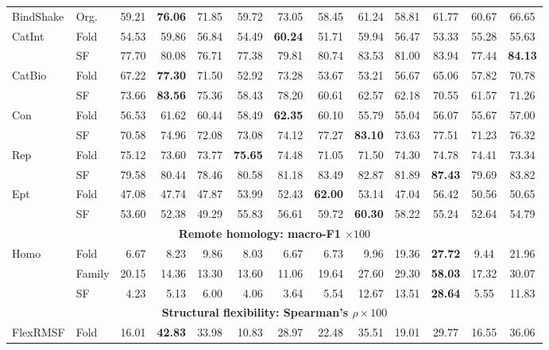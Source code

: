 \documentclass{article}
\begin{document}
\begin{minipage}{\linewidth}
\begin{tabular*}{\linewidth}{@{\extracolsep{\fill}}ll*{7}{r}@{\hspace{1.5pt}\vrule width 0.45pt\hspace{1.5pt}}*{4}{c}@{}}
BindShake & Org. & 59.21 & \textbf{76.06} & 71.85 & 59.72 & 73.05 & 58.45 & 61.24 & 58.81 & 61.77 & 60.67 & 66.65 \\
\multirow{2}{*}{CatInt} & Fold & 54.53 & 59.86 & 56.84 & 54.49 & \textbf{60.24} & 51.71 & 59.94 & 56.47 & 53.33 & 55.28 & 55.63 \\
 & SF   & 77.70 & 80.08 & 76.71 & 77.38 & 79.81 & 80.74 & 83.53 & 81.00 & 83.94 & 77.44 & \textbf{84.13} \\
\multirow{2}{*}{CatBio} & Fold & 67.22 & \textbf{77.30} & 71.50 & 52.92 & 73.28 & 53.67 & 53.21 & 56.67 & 65.06 & 57.82 & 70.78 \\
 & SF   & 73.66 & \textbf{83.56} & 75.36 & 58.43 & 78.20 & 60.61 & 62.57 & 62.18 & 70.55 & 61.57 & 71.26 \\
\multirow{2}{*}{Con} & Fold & 56.53 & 61.62 & 60.44 & 58.49 & \textbf{62.35} & 60.10 & 55.79 & 55.04 & 56.07 & 55.67 & 57.00 \\
 & SF   & 70.58 & 74.96 & 72.08 & 73.08 & 74.12 & 77.27 & \textbf{83.10} & 73.63 & 77.51 & 71.23 & 76.32 \\
\multirow{2}{*}{Rep} & Fold & 75.12 & 73.60 & 73.77 & \textbf{75.65} & 74.48 & 71.05 & 71.50 & 74.30 & 74.78 & 74.41 & 73.34 \\
 & SF   & 79.58 & 80.44 & 78.46 & 80.58 & 81.18 & 83.49 & 82.87 & 81.89 & \textbf{87.43} & 79.69 & 83.82 \\
\multirow{2}{*}{Ept} & Fold & 47.08 & 47.74 & 47.87 & 53.99 & 52.43 & \textbf{62.00} & 53.14 & 47.04 & 56.42 & 50.56 & 50.65 \\
 & SF   & 53.60 & 52.38 & 49.29 & 55.83 & 56.61 & 59.72 & \textbf{60.30} & 58.22 & 55.24 & 52.64 & 54.79 \\
\midrule
\multicolumn{13}{c}{\textbf{Remote homology: macro-F1 $\times 100$}} \\
\midrule
\multirow{3}{*}{Homo} & Fold   & 6.67 & 8.23 & 9.86 & 8.03 & 6.67 & 6.73 & 9.96 & 19.36 & \textbf{27.72} & 9.44 & 21.96 \\
 & Family & 20.15 & 14.36 & 13.30 & 13.60 & 11.06 & 19.64 & 27.60 & 29.30 & \textbf{58.03} & 17.32 & 30.07 \\
 & SF     & 4.23 & 5.13 & 6.00 & 4.06 & 3.64 & 5.54 & 12.67 & 13.51 & \textbf{28.64} & 5.55 & 11.83 \\
\midrule
\multicolumn{13}{c}{\textbf{Structural flexibility: Spearman's $\rho \times 100$}} \\
\midrule
\multirow{2}{*}{FlexRMSF} & Fold & 16.01 & \textbf{42.83} & 33.98 & 10.83 & 28.97 & 22.48 & 35.51 & 19.01 & 29.77 & 16.55 & 36.06 \\

\end{tabular*}
\end{minipage}
\end{document}
